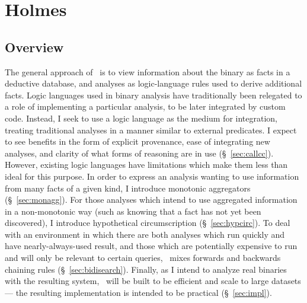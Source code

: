 \chapter{Holmes}
\section{Overview}
The general approach of \sysname\ is to view information about the binary as facts in a deductive database, and analyses as logic-language rules used to derive additional facts.
Logic languages used in binary analysis have traditionally been relegated to a role of implementing a particular analysis, to be later integrated by custom code\cite{bddbddb,Alpuente2011,Brumley2006b,Lam2005a,Smaragdakis}.
Instead, I seek to use a logic language as the medium for integration, treating traditional analyses in a manner similar to external predicates.
I expect to see benefits in the form of explicit provenance, ease of integrating new analyses, and clarity of what forms of reasoning are in use (\S~\ref{sec:callcc}).
However, existing logic languages have limitations which make them less than ideal for this purpose.
In order to express an analysis wanting to use information from many facts of a given kind, I introduce monotonic aggregators (\S~\ref{sec:monagg}).
For those analyses which intend to use aggregated information in a non-monotonic way (such as knowing that a fact has not yet been discovered), I introduce hypothetical circumscription (\S~\ref{sec:hypcirc}).
To deal with an environment in which there are both analyses which run quickly and have nearly-always-used result, and those which are potentially expensive to run and will only be relevant to certain queries, \sysname\ mixes forwards and backwards chaining rules (\S~\ref{sec:bidisearch}).
Finally, as I intend to analyze real binaries with the resulting system, \sysname\ will be built to be efficient and scale to large datasets --- the resulting implementation is intended to be practical (\S~\ref{sec:impl}).

